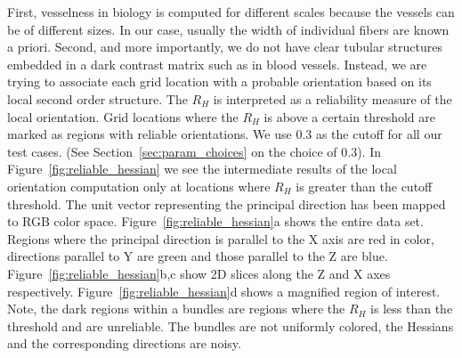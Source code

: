 First, vesselness in biology is computed for different scales because the vessels can be of different sizes. In our case, usually the width of individual fibers are known a priori.
Second, and more importantly, we do not have clear tubular structures embedded in a dark contrast matrix such as in blood vessels.
Instead, we are trying to associate each grid location  with a probable orientation based on its local second order structure. The $R_{H}$ is interpreted as a reliability measure of the local orientation.
Grid locations where the $R_{H}$ is above a certain threshold are marked as regions with reliable orientations.
We use 0.3 as the cutoff for all our test cases. (See Section~\ref{sec:param_choices} on the choice of 0.3).
In Figure~\ref{fig:reliable_hessian} we see the intermediate results of the local orientation computation only at locations where $R_{H}$ is greater than the cutoff threshold. The unit vector representing the principal direction has been mapped to RGB color space. Figure~\ref{fig:reliable_hessian}a shows the entire data set. Regions where the principal direction is parallel to the X axis are red in color, directions parallel to Y are green and those parallel to the Z are blue. Figure~\ref{fig:reliable_hessian}b,c show 2D slices along the Z and X axes respectively. Figure~\ref{fig:reliable_hessian}d shows a magnified region of interest. Note, the dark regions within a bundles are regions where the $R_H$ is less than the threshold and are unreliable. The bundles are not uniformly colored, the Hessians and the corresponding directions are noisy.

